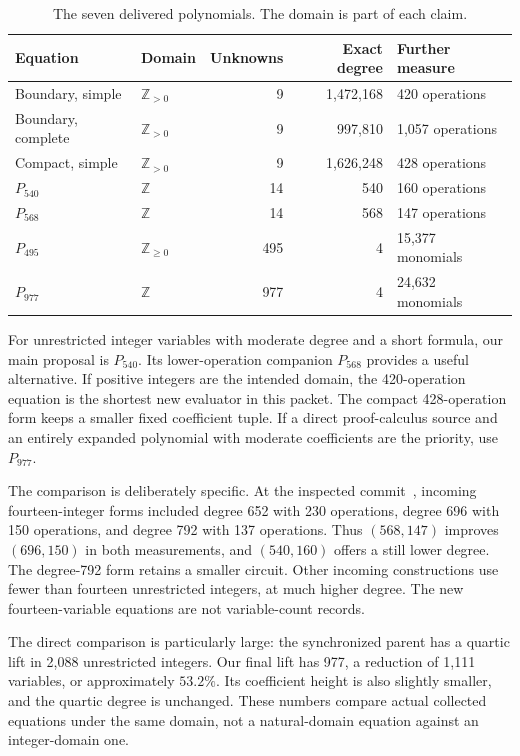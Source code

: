 \documentclass[11pt,a4paper]{article}
\theoremstyle{definition}
\begin{document}
\begin{table}[ht]
\centering
\small
\setlength{\tabcolsep}{4pt}
\begin{tabular}{llrrl}
\toprule
Equation & Domain & Unknowns & Exact degree & Further measure\\
\midrule
Boundary, simple & $\mathbb Z_{>0}$ & 9 & 1,472,168 & 420 operations\\
Boundary, complete & $\mathbb Z_{>0}$ & 9 & 997,810 & 1,057 operations\\
Compact, simple & $\mathbb Z_{>0}$ & 9 & 1,626,248 & 428 operations\\
$P_{540}$ & $\mathbb Z$ & 14 & 540 & 160 operations\\
$P_{568}$ & $\mathbb Z$ & 14 & 568 & 147 operations\\
$P_{495}$ & $\mathbb Z_{\ge0}$ & 495 & 4 & 15,377 monomials\\
$P_{977}$ & $\mathbb Z$ & 977 & 4 & 24,632 monomials\\
\bottomrule
\end{tabular}
\caption{The seven delivered polynomials. The domain is part of each claim.}
\label{tab:results}
\end{table}

For unrestricted integer variables with moderate degree and a short
formula, our main proposal is $P_{540}$. Its lower-operation companion
$P_{568}$ provides a useful alternative. If positive integers are the
intended domain, the 420-operation equation is the shortest new evaluator
in this packet. The compact 428-operation form keeps a smaller fixed
coefficient tuple. If a direct proof-calculus source and an entirely
expanded polynomial with moderate coefficients are the priority, use
$P_{977}$.

The comparison is deliberately specific. At the inspected commit~\cite{proveit},
incoming fourteen-integer forms included degree 652 with 230 operations,
degree 696 with 150 operations, and degree 792 with 137 operations. Thus
$(568,147)$ improves $(696,150)$ in both measurements, and $(540,160)$
offers a still lower degree. The degree-792 form retains a smaller circuit.
Other incoming constructions use fewer than fourteen unrestricted
integers, at much higher degree. The new fourteen-variable equations are
not variable-count records.

The direct comparison is particularly large: the synchronized parent has
a quartic lift in 2,088 unrestricted integers. Our final lift has 977,
a reduction of 1,111 variables, or approximately $53.2\%$. Its coefficient
height is also slightly smaller, and the quartic degree is unchanged.
These numbers compare actual collected equations under the same domain,
not a natural-domain equation against an integer-domain one.
\end{document}
